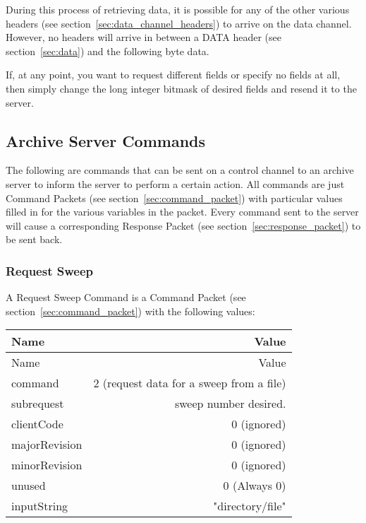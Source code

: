 \documentclass[10pt]{article}
\newcommand{\tblspc}{\rule{0pt}{3ex}}
\begin{document}
During this process of retrieving data, it is possible for any of the other various headers (see section~\ref{sec:data_channel_headers}) to arrive on the data channel. However, no headers will arrive in between a DATA header (see section~\ref{sec:data}) and the following byte data.

If, at any point, you want to request different fields or specify no fields at all, then simply change the long integer bitmask of desired fields and resend it to the server.

\subsection{Archive Server Commands}
\label{sec:archive_commands}
The following are commands that can be sent on a control channel to an archive server to inform the server to perform a certain action. All commands are just Command Packets (see section~\ref{sec:command_packet}) with particular values filled in for the various variables in the packet. Every command sent to the server will cause a corresponding Response Packet (see section~\ref{sec:response_packet}) to be sent back.

\subsubsection{Request Sweep}
\label{sec:request_sweep}
A Request Sweep Command is a Command Packet (see section~\ref{sec:command_packet}) with the following values:
\begin{longtable}{|l|r|}
\hline Name & Value \\ \hline \endfirsthead
\hline Name & Value \\ \hline \endhead
\hline \endfoot
\tblspc command & 2 (request data for a sweep from a file) \\
\hline
\tblspc subrequest & sweep number desired. \\
\hline
\tblspc clientCode & 0 (ignored) \\
\hline
\tblspc majorRevision & 0 (ignored) \\
\hline
\tblspc minorRevision & 0 (ignored) \\
\hline
\tblspc unused & 0 (Always 0) \\
\hline
\tblspc inputString & "directory/file" \\
\hline
\end{longtable}
\end{document}
